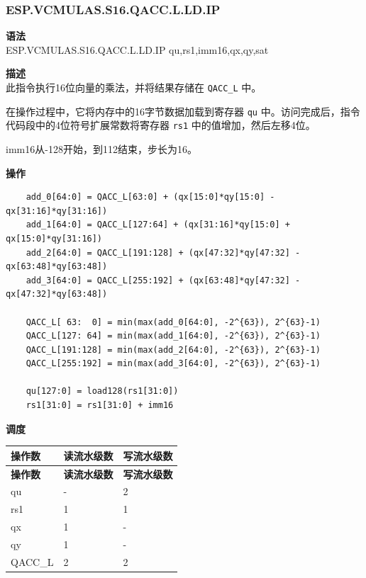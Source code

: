 \newpage

\newpage
\subsubsection{ESP.VCMULAS.S16.QACC.L.LD.IP}\label{instruction:ESPVCMULASS16QACC_LLDIP}
\textbf{语法}\\
ESP.VCMULAS.S16.QACC.L.LD.IP qu,rs1,imm16,qx,qy,sat

\textbf{描述}\\
此指令执行16位向量的乘法，并将结果存储在 \lstinline{QACC_L} 中。

在操作过程中，它将内存中的16字节数据加载到寄存器 \lstinline{qu} 中。访问完成后，指令代码段中的4位符号扩展常数将寄存器 \lstinline{rs1} 中的值增加，然后左移4位。

imm16从-128开始，到112结束，步长为16。

\textbf{操作}\\
\begin{lstlisting}
    add_0[64:0] = QACC_L[63:0] + (qx[15:0]*qy[15:0] - qx[31:16]*qy[31:16])
    add_1[64:0] = QACC_L[127:64] + (qx[31:16]*qy[15:0] + qx[15:0]*qy[31:16])
    add_2[64:0] = QACC_L[191:128] + (qx[47:32]*qy[47:32] - qx[63:48]*qy[63:48])
    add_3[64:0] = QACC_L[255:192] + (qx[63:48]*qy[47:32] - qx[47:32]*qy[63:48])

    QACC_L[ 63:  0] = min(max(add_0[64:0], -2^{63}), 2^{63}-1)
    QACC_L[127: 64] = min(max(add_1[64:0], -2^{63}), 2^{63}-1)
    QACC_L[191:128] = min(max(add_2[64:0], -2^{63}), 2^{63}-1)
    QACC_L[255:192] = min(max(add_3[64:0], -2^{63}), 2^{63}-1)

    qu[127:0] = load128(rs1[31:0])
    rs1[31:0] = rs1[31:0] + imm16
\end{lstlisting}

\textbf{调度}\\
\begin{longtable}[c]{|l|l|l|}
    \hline
    \rowcolor{lightgray}
    \textbf{操作数} & \textbf{读流水级数} & \textbf{写流水级数} \\\hline
    \endfirsthead
    \hline
    \rowcolor{lightgray}
     \textbf{操作数} & \textbf{读流水级数} & \textbf{写流水级数} \\\hline
    \endhead
    \hline
    \endfoot

    qu & - & 2 \\\hline
    rs1 & 1 & 1 \\\hline
     qx & 1 & - \\\hline
     qy & 1 & - \\\hline
     QACC\_L & 2 & 2

\end{longtable}


